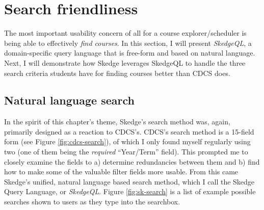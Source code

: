 
\section{Search friendliness}

The most important usability concern of all for a course explorer/scheduler is being able to effectively \emph{find courses}. In this section, I will present \emph{SkedgeQL}, a domain-specific query language that is free-form and based on natural language. Next, I will demonstrate how Skedge leverages SkedgeQL to handle the three search criteria students have for finding courses better than CDCS does.

\subsection{Natural language search}

In the spirit of this chapter's theme, Skedge's search method was, again, primarily designed as a reaction to CDCS's. CDCS's search method is a 15-field form (see Figure \ref{fig:cdcs-search}), of which I only found myself regularly using two (one of them being the \emph{required} ``Year/Term'' field). This prompted me to closely examine the fields to a) determine redundancies between them and b) find how to make some of the valuable filter fields more usable. From this came Skedge's unified, natural language based search method, which I call the Skedge Query Language, or \emph{SkedgeQL}. Figure \ref{fig:sk-search} is a list of example possible searches shown to users as they type into the searchbox.

